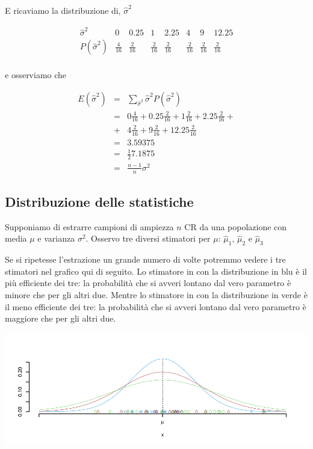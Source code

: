 \documentclass[
  11pt,
]{book}
\theoremstyle{mytheoremstyle}
\theoremstyle{mydefstyle}
\begin{document}
\normalsize E ricaviamo la distribuzione di, \(\hat\sigma^2\)

\[
\begin{array}{ r|rrrrrrr }
 \hat\sigma^2  & 0& 0.25& 1& 2.25& 4& 9& 12.25 \\ 
 \hline 
 P( \hat\sigma^2 ) & \frac{4}{16}& \frac{2}{16}& \frac{2}{16}& \frac{2}{16}& \frac{2}{16}& \frac{2}{16}& \frac{2}{16} \\ 
 \end{array}
\]

e osserviamo che

\begin{eqnarray*} E(\hat\sigma^2) &=& \sum_{\hat\sigma^2}\hat\sigma^2 P(\hat\sigma^2)\\ 
 &=&  0  \frac { 4 }{ 16 }+ 0.25  \frac { 2 }{ 16 }+ 1  \frac { 2 }{ 16 }+ 2.25  \frac { 2 }{ 16 }+ \\
 &+&  4  \frac { 2 }{ 16 }+ 9  \frac { 2 }{ 16 }+ 12.25  \frac { 2 }{ 16 } \\ 
 &=& 3.59375 \\
 &=& \frac{1}{2}7.1875\\
 &=& \frac{n-1}{n}\sigma^2
\end{eqnarray*}

\subsection{Distribuzione delle statistiche}\label{distribuzione-delle-statistiche}

Supponiamo di estrarre campioni di ampiezza \(n\) CR da una popolazione con media \(\mu\) e varianza \(\sigma^2\).
Osservo tre diversi stimatori per \(\mu\): \(\hat\mu_1\), \(\hat\mu_2\) e \(\hat\mu_3\)

Se si ripetesse l'estrazione un grande numero di volte potremmo vedere i tre stimatori nel grafico qui di seguito.
Lo stimatore in con la distribuzione in blu è il più efficiente dei tre: la probabilità che si avveri lontano dal vero parametro è minore che per gli altri due.
Mentre lo stimatore in con la distribuzione in verde è il meno efficiente dei tre: la probabilità che si avveri lontano dal vero parametro è maggiore che per gli altri due.

\begin{center}\includegraphics{Appunti_di_Statistica_2025_files/figure-latex/11-Stima-8-1} \end{center}
\end{document}
